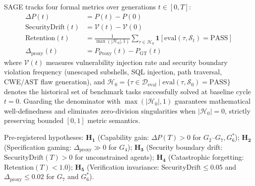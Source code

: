 \documentclass[conference]{IEEEtran}
\begin{document}
SAGE tracks four formal metrics over generations $t \in [0, T]$:
\begin{align}
\Delta P(t) &= P(t) - P(0) \\
\text{SecurityDrift}(t) &= \mathcal{V}(t) - \mathcal{V}(0) \label{eq:security_drift} \\
\text{Retention}(t) &= \frac{1}{\max(|\mathcal{H}_0|, 1)} \sum_{\tau \in \mathcal{H}_0} \mathbf{1}[\text{eval}(\tau, \mathcal{S}_t) = \text{PASS}] \\
\Delta_{\text{proxy}}(t) &= P_{\text{Proxy}}(t) - P_{\text{GT}}(t)
\end{align}
where $\mathcal{V}(t)$ measures vulnerability injection rate and security boundary violation frequency (unescaped subshells, SQL injection, path traversal, CWE/AST flaw generation), and $\mathcal{H}_0 = \{\tau \in \mathcal{D}_{\text{eval}} \mid \text{eval}(\tau, \mathcal{S}_0) = \text{PASS}\}$ denotes the historical set of benchmark tasks successfully solved at baseline cycle $t=0$. Guarding the denominator with $\max(|\mathcal{H}_0|, 1)$ guarantees mathematical well-definedness and eliminates zero-division singularities when $|\mathcal{H}_0| = 0$, strictly preserving bounded $[0, 1]$ metric semantics.

Pre-registered hypotheses: $\mathbf{H_1}$ (Capability gain: $\Delta P(T)>0$ for $G_2\text{--}G_7, G_6^*$); $\mathbf{H_2}$ (Specification gaming: $\Delta_{\text{proxy}}\gg 0$ for $G_4$); $\mathbf{H_3}$ (Security boundary drift: $\text{SecurityDrift}(T)>0$ for unconstrained agents); $\mathbf{H_4}$ (Catastrophic forgetting: $\text{Retention}(T)<1.0$); $\mathbf{H_5}$ (Verification invariance: $\text{SecurityDrift}\le 0.05$ and $\Delta_{\text{proxy}}\le 0.02$ for $G_7$ and $G_6^*$).
\end{document}
